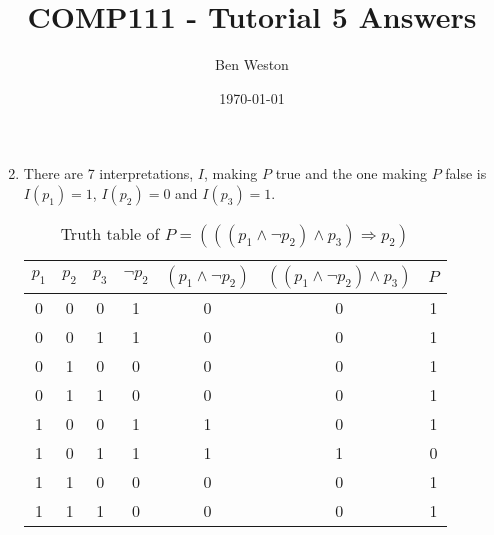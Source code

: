 \documentclass{article}
\title{COMP111 - Tutorial 5 Answers}
\author{Ben Weston}
\date{\today}
\begin{document}
\maketitle
\begin{enumerate}\setcounter{enumi}{1}
        \item{        
                        There are 7 interpretations, $I$, making $P$ true and the one making $P$ false is $I(p_1)=1$, $I(p_2)=0$ and $I(p_3)=1$.
\begin{table}[H]
                                \centering
                                \begin{tabular}[t]{|c|c|c|c|c|c|c|}
                                \hline
                                $p_1$ & $p_2$ & $p_3$ & $\neg p_2$ & $(p_1\wedge\neg p_2)$ & $((p_1\wedge\neg p_2)\wedge p_3)$ & $P$\\
                                \hline\hline
                                0 & 0 & 0 & 1 & 0 & 0 & 1\\
                                \hline
                                0 & 0 & 1 & 1 & 0 & 0 & 1\\
                                \hline
                                0 & 1 & 0 & 0 & 0 & 0 & 1\\
                                \hline
                                0 & 1 & 1 & 0 & 0 & 0 & 1\\
                                \hline
                                1 & 0 & 0 & 1 & 1 & 0 & 1\\
                                \hline
                                1 & 0 & 1 & 1 & 1 & 1 & 0\\
                                \hline
                                1 & 1 & 0 & 0 & 0 & 0 & 1\\
                                \hline
                                1 & 1 & 1 & 0 & 0 & 0 & 1\\
                                \hline
                                \end{tabular}
                                \caption{Truth table of $P=(((p_1\wedge\neg p_2)\wedge p_3)\Rightarrow p_2)$}
                        \end{table}

}
\end{enumerate}
\end{document}
